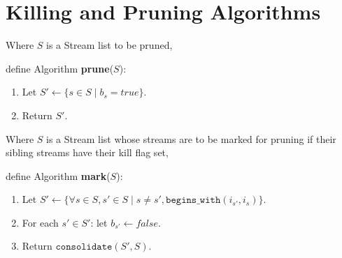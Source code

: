 \section{Killing and Pruning Algorithms}

 \begin{framed}
  Where ${S}$ is a Stream list to be pruned, 

 \vspace{12pt}
  define Algorithm \textbf{prune}(${S}$):
 
  \begin{enumerate}
   \item Let $S' \leftarrow \{ s \in S \mid b_s = true \}$.
   \item Return $S'$.
  \end{enumerate}

 \end{framed}



 \begin{framed}

  Where $S$ is a Stream list whose streams are to be marked for pruning if
their sibling streams have their kill flag set,

 \vspace{12pt}
 define Algorithm \textbf{mark}(${S}$):

  \begin{enumerate}
   \item Let $S' \leftarrow \{ \forall s \in S, s' \in S \mid s \not = s', \texttt{begins\_with}(i_{s'}, i_s)\}$.
   \item For each $s' \in S'$: let $b_{s'} \leftarrow false$.
   \item Return $\texttt{consolidate}(S', S)$.
  \end{enumerate}

 \end{framed}

